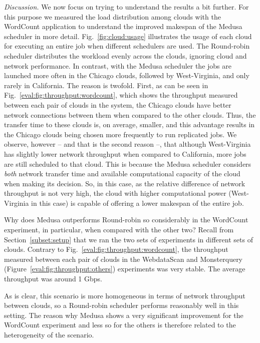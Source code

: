 \documentclass[10pt, conference, compsocconf]{IEEEtran}
\begin{document}
\textit{Discussion.}
We now focus on trying to understand the results a bit further.
For this purpose we measured the load distribution among clouds with the WordCount application to understand the improved makespan of the Medusa scheduler in more detail.
Fig.~\ref{fig:cloud:usage} illustrates the usage of each cloud for executing an entire job when
different schedulers are used. The Round-robin scheduler distributes the workload evenly across the clouds, ignoring cloud and network performance.
In contrast, with the Medusa scheduler the jobs are launched more often in the Chicago clouds, followed by West-Virginia, and only rarely in California.
The reason is twofold.
First, as can be seen in Fig.~\ref{eval:fig:throughput:wordcount}, which shows the throughput measured between each pair of clouds in the system, the Chicago clouds have better network connections between them when compared to the other clouds.
Thus, the transfer time to these clouds is, on average, smaller, and this advantage results in the Chicago clouds being chosen more frequently to run replicated jobs.
We observe, however -- and that is the second reason --, that although West-Virginia has slightly lower network throughput when compared to California, more jobs are still scheduled to that cloud.
This is because the Medusa scheduler considers \emph{both} network transfer time and available computational capacity of the cloud when making its decision.
So, in this case, as the relative difference of network throughput is not very high, the cloud with higher computational power (West-Virginia in this case) is capable of offering a lower makespan of the entire job.

Why does Medusa outperforms Round-robin so considerably in the WordCount experiment, in particular, when compared with the other two?
Recall from Section~\ref{subset:setup} that we ran the two sets of experiments in different sets of clouds.
Contrary to Fig.~\ref{eval:fig:throughput:wordcount}, the throughput measured between each pair of clouds in the WebdataScan and Monsterquery (Figure~\ref{eval:fig:throughput:others}) experiments was very stable.
The average throughput was around 1 Gbps.


As is clear, this scenario is more homogeneous in terms of network throughput between clouds, so a Round-robin scheduler performs reasonably well in this setting.
The reason why Medusa shows a very significant improvement for the WordCount experiment and less so for the others is therefore related to the heterogeneity of the scenario.
\end{document}
